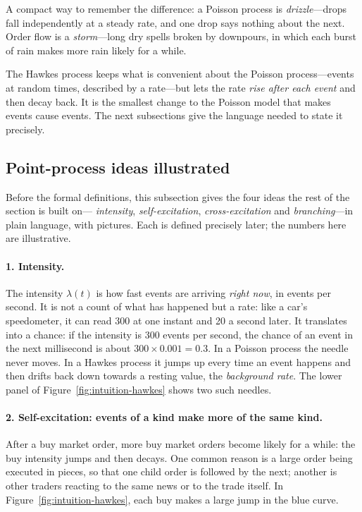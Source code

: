 A compact way to remember the difference: a Poisson process is \emph{drizzle}---drops fall
independently at a steady rate, and one drop says nothing about the next. Order flow is a
\emph{storm}---long dry spells broken by downpours, in which each burst of rain makes more rain likely
for a while.

The Hawkes process keeps what is convenient about the Poisson process---events at random times,
described by a rate---but lets the rate \emph{rise after each event} and then decay back. It is the
smallest change to the Poisson model that makes events cause events. The next subsections give the
language needed to state it precisely.


\subsection{Point-process ideas illustrated}
\label{sec:hawkes-intuition}

Before the formal definitions, this subsection gives the four ideas the rest of the section is built on---
\emph{intensity}, \emph{self-excitation}, \emph{cross-excitation} and \emph{branching}---in plain language,
with pictures. Each is defined precisely later; the numbers here are illustrative.

\paragraph{1. Intensity.} The intensity $\lambda(t)$ is how fast events are arriving
\emph{right now}, in events per second. It is not a count of what has happened but a rate: like a car's
speedometer, it can read 300 at one instant and 20 a second later. It translates into a chance: if the intensity
is 300 events per second, the chance of an event in the next millisecond is about $300 \times 0.001 = 0.3$. In a
Poisson process the needle never moves. In a Hawkes process it jumps up every time an event happens and then
drifts back down towards a resting value, the \emph{background rate}. The lower panel of
Figure~\ref{fig:intuition-hawkes} shows two such needles.

\paragraph{2. Self-excitation: events of a kind make more of the same kind.} After a buy market order, more buy
market orders become likely for a while: the buy intensity jumps and then decays. One common reason is a large
order being executed in pieces, so that one child order is followed by the next; another is other traders
reacting to the same news or to the trade itself. In Figure~\ref{fig:intuition-hawkes}, each buy makes a large
jump in the blue curve.

